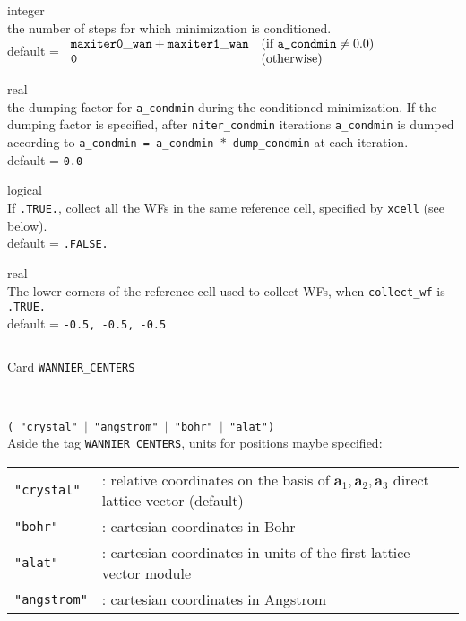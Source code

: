 {\noindent{}%
{\sc integer} \\ the number of steps for which minimization is conditioned.\\
{\sc default} = $\begin{array}{ll}
           {\tt maxiter0\_wan + maxiter1\_wan}     & \textrm{(if {\tt a\_condmin}} \neq 0.0)\\
           {\tt 0}                                 & \textrm{(otherwise)}
           \end{array}$ \par

\noindent{}%
{\sc real} \\ the dumping factor for {\tt a\_condmin} during the conditioned minimization.
              If the dumping factor is specified, after {\tt niter\_condmin}
              iterations {\tt a\_condmin}
              is dumped according to {\tt a\_condmin = a\_condmin $*$ dump\_condmin}
              at each iteration.\\
{\sc default} = {\tt 0.0} \par

\noindent{}%
{\sc logical} \\ If {\tt .TRUE.}, collect all the WFs in the same reference cell, 
                 specified by {\tt xcell} (see below). \\
{\sc default} = {\tt .FALSE.} \par

\noindent{}%
{\sc real} \\ The lower corners of the reference cell used to collect WFs, when
              {\tt collect\_wf} is {\tt .TRUE.} \\
{\sc default} = {\tt -0.5, -0.5, -0.5} \par
}
\bigskip

\begin{centering}
\rule{2.0in}{0.01in} Card {\tt WANNIER\_CENTERS} \rule{2.0in}{0.01in}
\end{centering}\\

{\tt ( "crystal" $\mid$ "angstrom" $\mid$ "bohr" $\mid$ "alat") }\\

\noindent Aside the tag {\tt WANNIER\_CENTERS}, units for positions maybe specified:\\
%
%
\begin{tabular}{ll}
\texttt{"crystal"}  & : relative coordinates on the basis of $\mathbf{a}_1,\mathbf{a}_2,\mathbf{a}_3$
                                direct lattice vector (default)\\
\texttt{"bohr"}     & : cartesian coordinates in Bohr\\
\texttt{"alat"}     & : cartesian coordinates in units of the
                        first lattice vector module\\
\texttt{"angstrom"} & : cartesian coordinates in Angstrom
\end{tabular}
%
%
\\

